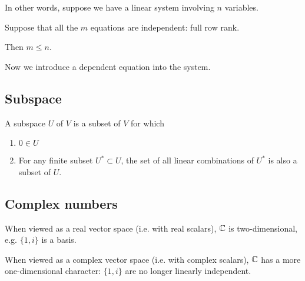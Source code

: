 In other words, suppose we have a linear system involving $n$ variables.

Suppose that all the $m$ equations are independent: full row rank.

Then $m \leq n$.

Now we introduce a dependent equation into the system.



\subsection{Subspace}
A subspace $U$ of $V$ is a subset of $V$ for which
\begin{enumerate}
\item $0 \in U$
\item For any finite subset $U^* \subset U$, the set of all linear combinations
  of $U^*$ is also a subset of $U$.
\end{enumerate}

\subsection{Complex numbers}
When viewed as a real vector space (i.e. with real scalars), $\mathbb{C}$ is
two-dimensional, e.g. $\{1, i\}$ is a basis.

When viewed as a complex vector space (i.e. with complex scalars), $\mathbb{C}$ has a
more one-dimensional character: $\{1, i\}$ are no longer linearly independent.


